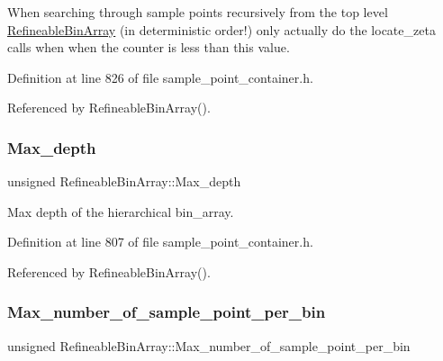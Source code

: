 When searching through sample points recursively from the top level \hyperlink{classRefineableBinArray}{Refineable\+Bin\+Array} (in deterministic order!) only actually do the locate\+\_\+zeta calls when when the counter is less than this value. 



Definition at line 826 of file sample\+\_\+point\+\_\+container.\+h.



Referenced by Refineable\+Bin\+Array().

\mbox{\label{classRefineableBinArray_a234ea22c1be2373c08ee64721735d898}} 
\subsubsection{\texorpdfstring{Max\+\_\+depth}{Max\_depth}}
{\footnotesize\ttfamily unsigned Refineable\+Bin\+Array\+::\+Max\+\_\+depth\hspace{0.3cm}{\ttfamily [private]}}



Max depth of the hierarchical bin\+\_\+array. 



Definition at line 807 of file sample\+\_\+point\+\_\+container.\+h.



Referenced by Refineable\+Bin\+Array().

\mbox{\label{classRefineableBinArray_a6841cb84bc34762a8b192db60393a98a}} 
\subsubsection{\texorpdfstring{Max\+\_\+number\+\_\+of\+\_\+sample\+\_\+point\+\_\+per\+\_\+bin}{Max\_number\_of\_sample\_point\_per\_bin}}
{\footnotesize\ttfamily unsigned Refineable\+Bin\+Array\+::\+Max\+\_\+number\+\_\+of\+\_\+sample\+\_\+point\+\_\+per\+\_\+bin\hspace{0.3cm}{\ttfamily [private]}}



